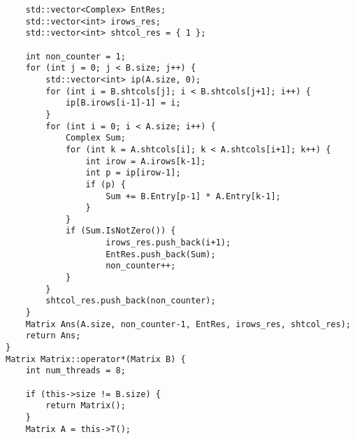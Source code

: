 \documentclass[12pt]{report}
\begin{document}
\begin{lstlisting}
    std::vector<Complex> EntRes;
    std::vector<int> irows_res;
    std::vector<int> shtcol_res = { 1 };

    int non_counter = 1;
    for (int j = 0; j < B.size; j++) {
        std::vector<int> ip(A.size, 0);
        for (int i = B.shtcols[j]; i < B.shtcols[j+1]; i++) {
            ip[B.irows[i-1]-1] = i;
        }
        for (int i = 0; i < A.size; i++) {
            Complex Sum;
            for (int k = A.shtcols[i]; k < A.shtcols[i+1]; k++) {
                int irow = A.irows[k-1];
                int p = ip[irow-1];
                if (p) {
                    Sum += B.Entry[p-1] * A.Entry[k-1];
                }
            }
            if (Sum.IsNotZero()) {
                    irows_res.push_back(i+1);
                    EntRes.push_back(Sum);
                    non_counter++;
            }
        }
        shtcol_res.push_back(non_counter);
    }
    Matrix Ans(A.size, non_counter-1, EntRes, irows_res, shtcol_res);
    return Ans;
}
Matrix Matrix::operator*(Matrix B) {
    int num_threads = 8;

    if (this->size != B.size) {
        return Matrix();
    }
    Matrix A = this->T();


\end{lstlisting}
\end{document}
